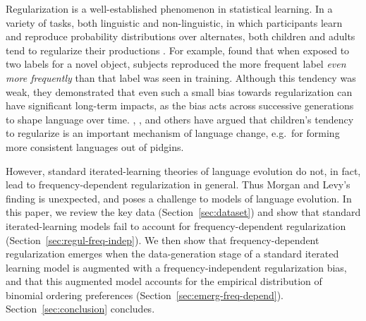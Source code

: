 \documentclass{evolang11}
\begin{document}

Regularization is a well-established phenomenon in statistical learning. In a variety of tasks, both linguistic and non-linguistic, in which participants learn and reproduce probability distributions over alternates, both children and adults tend to regularize their productions \cite{HudsonKam:2005we,Reali:2009dp,FERDINAND:2014tk}. For example,  found that when exposed to two labels for a novel object, subjects reproduced the more frequent label \emph{even more frequently} than that label was seen in training. Although this tendency was weak, they demonstrated that even such a small bias towards regularization can have significant long-term impacts, as the bias acts across successive generations to shape language over time.  , , and others have argued that children's tendency to regularize is an important mechanism of language change, e.g.\ for forming more consistent languages out of pidgins.

However, standard iterated-learning theories of language evolution do not, in fact, lead to frequency-dependent regularization in general.  Thus Morgan and Levy's finding is unexpected, and poses a challenge to models of language evolution. In this paper, we review the key data (Section~\ref{sec:dataset}) and show that standard iterated-learning models fail to account for frequency-dependent regularization (Section~\ref{sec:regul-freq-indep}). We then show that frequency-dependent regularization emerges when the data-generation stage of a standard iterated learning model is augmented with a frequency-independent regularization bias, and that this augmented model accounts for the empirical distribution of binomial ordering preferences (Section~\ref{sec:emerg-freq-depend}). Section~\ref{sec:conclusion} concludes.
\end{document}
